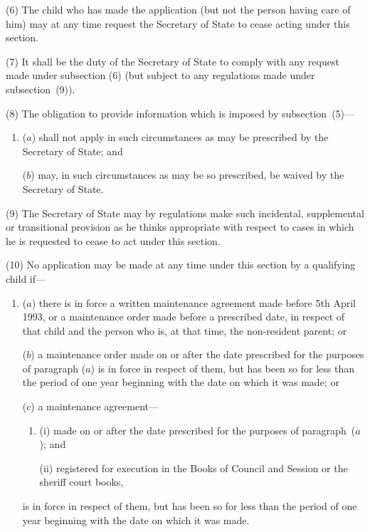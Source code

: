 \documentclass[12pt,a4paper]{article}
\begin{document}
(6)
The child who has made the application (but not the person having care of him)
may at any time request the Secretary of State to cease acting under this section.

(7)
It shall be the duty of the Secretary of State to comply with any request made
under subsection (6) (but subject to any regulations made under subsection~(9)).

(8)
The obligation to provide information which is imposed by subsection~(5)---
\begin{enumerate}\item[]
($a$)
shall not apply in such circumstances as may be prescribed by the Secretary
of State; and

($b$)
may, in such circumstances as may be so prescribed, be waived by the
Secretary of State.
\end{enumerate}

(9)
The Secretary of State may by regulations make such incidental, supplemental
or transitional provision as he thinks appropriate with respect to cases
in which he is requested to cease to act under this section.

(10) No application may be made at any time under this section by a qualifying
child if---
\begin{enumerate}\item[]
($a$)
there is in force a written maintenance agreement made before 5th
April 1993, or a maintenance order made before a prescribed date, in
respect of that child and the person who is, at that time, the non-resident
parent; or

($b$)
a maintenance order made on or after the date prescribed for the purposes
of paragraph ($a$) is in force in respect of them, but has been so for less than
the period of one year beginning with the date on which it was made; or

($c$)
a maintenance agreement---
\begin{enumerate}\item[]
(i)
made on or after the date prescribed for the purposes of paragraph~($a$); and

(ii)
registered for execution in the Books of Council and Session or the
sheriff court books,
\end{enumerate}
is in force in respect of them, but has been so for less than the period of one year
beginning with the date on which it was made.
\end{enumerate}
\end{document}
